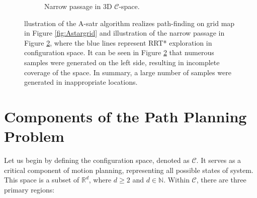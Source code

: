\documentclass{ctuthesis}
\begin{document}
\begin{figure}
\begin{subfigure}[b]{0.61\textwidth}
      \caption{Narrow passage in 3D $\mathcal{C}$-space.}
      \label{fig:narrowpassage2}
  \end{subfigure} 
  \caption{llustration of the A-satr algorithm realizes path-finding on grid map in Figure \ref{fig:Astargrid} and 
  illustration of the narrow passage in Figure \ref{fig:narrowpassage2}, 
  where the blue lines represent RRT* exploration in configuration space.
  It can be seen in Figure \ref{fig:narrowpassage2} that numerous samples were generated on the left side, 
  resulting in incomplete coverage of the space. 
  In summary, a large number of samples were generated in inappropriate locations.} 
\end{figure}

\section{Components of the Path Planning Problem}

Let us begin by defining the configuration space, denoted as $\mathcal{C}$. 
It serves as a critical component of motion planning, representing all possible states of system. 
This space is a subset of $\mathbb{R}^d$, where $d \geq 2$ and $d \in \mathbb{N}$. 
Within $\mathcal{C}$, there are three primary regions:
\end{document}
